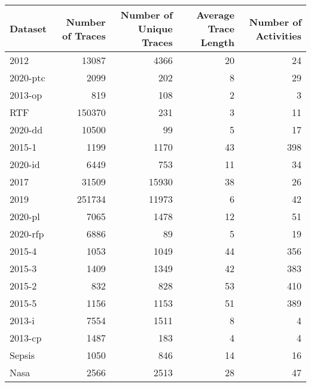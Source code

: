 \begin{tabular}{lrrrr}
\toprule
Dataset & Number of Traces & Number of Unique Traces & Average Trace Length & Number of Activities \\
\midrule
2012 & 13087 & 4366 & 20 & 24 \\
2020-ptc & 2099 & 202 & 8 & 29 \\
2013-op & 819 & 108 & 2 & 3 \\
RTF & 150370 & 231 & 3 & 11 \\
2020-dd & 10500 & 99 & 5 & 17 \\
2015-1 & 1199 & 1170 & 43 & 398 \\
2020-id & 6449 & 753 & 11 & 34 \\
2017 & 31509 & 15930 & 38 & 26 \\
2019 & 251734 & 11973 & 6 & 42 \\
2020-pl & 7065 & 1478 & 12 & 51 \\
2020-rfp & 6886 & 89 & 5 & 19 \\
2015-4 & 1053 & 1049 & 44 & 356 \\
2015-3 & 1409 & 1349 & 42 & 383 \\
2015-2 & 832 & 828 & 53 & 410 \\
2015-5 & 1156 & 1153 & 51 & 389 \\
2013-i & 7554 & 1511 & 8 & 4 \\
2013-cp & 1487 & 183 & 4 & 4 \\
Sepsis & 1050 & 846 & 14 & 16 \\
Nasa & 2566 & 2513 & 28 & 47 \\
\bottomrule
\end{tabular}

